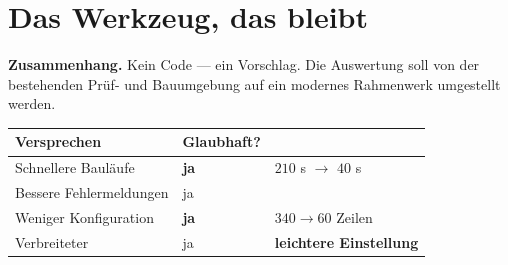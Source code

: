 \chapter{Das Werkzeug, das bleibt}\label{fall:werkzeug}

\begin{merksatz}
\textbf{Zusammenhang.} Kein Code --- ein Vorschlag. Die Auswertung soll von der bestehenden Prüf- und Bauumgebung auf ein modernes Rahmenwerk umgestellt werden.

\begin{center}
{\small
\renewcommand{\arraystretch}{1.45}
\begin{tabular}{@{}P{2.8cm}P{2.4cm}P{2.6cm}@{}}
\toprule
\textbf{Versprechen} & \textbf{Glaubhaft?} & \\
\midrule
Schnellere Bauläufe & \textcolor{gruen}{\textbf{ja}} & $210$ s $\to$ $40$ s\\
Bessere Fehlermeldungen & \textcolor{gruen}{ja} & \\
Weniger Konfiguration & \textcolor{gruen}{\textbf{ja}} & $340 \to 60$ Zeilen\\
Verbreiteter & \textcolor{gruen}{ja} & \textbf{leichtere Einstellung}\\
\bottomrule
\end{tabular}}
\end{center}

\begin{center}
\begin{minipage}{0.88\textwidth}
\end{minipage}
\end{center}
\end{merksatz}

